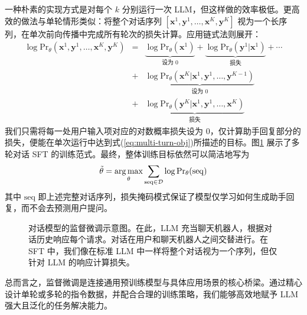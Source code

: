 一种朴素的实现方式是对每个 $k$ 分别运行一次 LLM，但这样做的效率极低。更高效的做法与单轮情形类似：将整个对话序列 $[\mathbf{x}^1,\mathbf{y}^1,\dots,\mathbf{x}^K,\mathbf{y}^K]$ 视为一个长序列，在单次前向传播中完成所有轮次的损失计算。应用链式法则展开：
\begin{eqnarray}
\log \mathrm{Pr}_{\theta}(\mathbf{x}^1,\mathbf{y}^1,\dots,\mathbf{x}^K,\mathbf{y}^K) &=& \underbrace{\log \mathrm{Pr}_{\theta}(\mathbf{x}^1)}_{\text{设为 }0} + \underbrace{\log \mathrm{Pr}_{\theta}(\mathbf{y}^1|\mathbf{x}^1)}_{\text{损失}} + \cdots \nonumber \\
&+& \underbrace{\log \mathrm{Pr}_{\theta}(\mathbf{x}^K|\mathbf{x}^1,\mathbf{y}^1,\dots,\mathbf{y}^{K-1})}_{\text{设为 }0} \nonumber \\
&+& \underbrace{\log \mathrm{Pr}_{\theta}(\mathbf{y}^K|\mathbf{x}^1,\mathbf{y}^1,\dots,\mathbf{x}^K)}_{\text{损失}}
\label{eq:multi-turn-chain}
\end{eqnarray}
我们只需将每一处用户输入项对应的对数概率损失设为 $0$，仅计算助手回复部分的损失，便能在单次运行中达到式(\ref{eq:multi-turn-obj})所描述的目标。图\ref{fig:sft-conversational-models} 展示了多轮对话 SFT 的训练范式。最终，整体训练目标依然可以简洁地写为
\begin{eqnarray}
\tilde{\theta} = \operatorname*{arg\,max}_{\theta} \sum_{\mathrm{seq} \in \mathcal{D}} \log \mathrm{Pr}_{\theta}(\mathrm{seq})
\end{eqnarray}
其中 $\mathrm{seq}$ 即上述完整对话序列，损失掩码模式保证了模型仅学习如何生成助手回复，而不会去预测用户提问。

\begin{figure}[!t]
\centering

\caption{对话模型的监督微调示意图。在此，LLM 充当聊天机器人，根据对话历史响应每个请求。对话在用户和聊天机器人之间交替进行。在 SFT 中，我们像在标准 LLM 中一样将整个对话视为一个序列，但仅针对 LLM 的响应计算损失。}
\label{fig:sft-conversational-models}
\end{figure}

\vspace{0.5em}
\noindent 总而言之，监督微调是连接通用预训练模型与具体应用场景的核心桥梁。通过精心设计单轮或多轮的指令数据，并配合合理的训练策略，我们能够高效地赋予 LLM 强大且泛化的任务解决能力。
